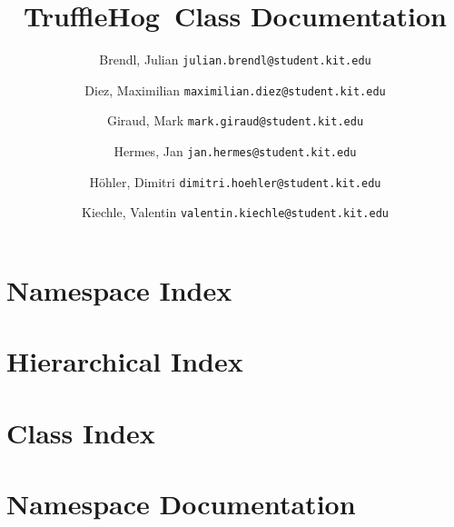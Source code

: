 \documentclass[listof=totoc,a4paper]{scrreprt}
\newcommand{\+}{\discretionary{\mbox{\scriptsize$\hookleftarrow$}}{}{}}
\newcommand{\programname}{TruffleHog}
\newcommand{\clearemptydoublepage}{%
  \newpage{\pagestyle{empty}\cleardoublepage}%
}
\begin{document}
\hypersetup{pageanchor=false,
             bookmarks=true,
             bookmarksnumbered=true,
             pdfencoding=unicode
            }

\begin{titlepage}
\title{\programname \ Class Documentation}
\author{
    Brendl, Julian
    \texttt{julian.brendl@student.kit.edu}
    \and
    Diez, Maximilian
    \texttt{maximilian.diez@student.kit.edu}
    \and
    Giraud, Mark
    \texttt{mark.giraud@student.kit.edu}
    \and
    Hermes, Jan
    \texttt{jan.hermes@student.kit.edu}
    \and
    Höhler, Dimitri
    \texttt{dimitri.hoehler@student.kit.edu}
    \and
    Kiechle, Valentin
    \texttt{valentin.kiechle@student.kit.edu}
}

\titlehead{\texttt{[image: images/title.png]}}

\maketitle

\setcounter{page}{2}
\end{titlepage}

\tableofcontents
\clearemptydoublepage
{}
\hypersetup{pageanchor=true}

\chapter{Namespace Index}

\chapter{Hierarchical Index}

\chapter{Class Index}

\chapter{Namespace Documentation}







\end{document}
